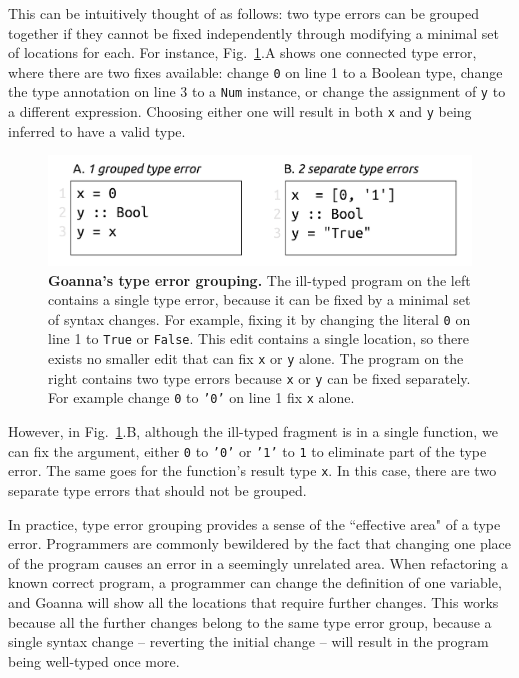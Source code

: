     This can be intuitively thought of as follows: two type errors can be grouped together if they cannot be fixed independently through modifying a minimal set of locations for each. For instance, Fig.~\ref{fig:grouping-example}.A shows one connected type error, where there are two fixes available: change \texttt{0} on line 1 to a Boolean type, change the type annotation on line 3 to a \texttt{Num} instance, or change the assignment of \texttt{y} to a different expression. Choosing either one will result in both \texttt{x} and \texttt{y} being inferred to have a valid type.
    
    

   \begin{figure}[ht!]
        \centering
        \includegraphics[width=0.8\linewidth]{images/Grouping-Example}
        \caption[Goanna's type error grouping]{\textbf{Goanna's type error grouping.} The ill-typed program on the left contains a single type error, because it can be fixed by a minimal set of syntax changes. For example, fixing it by changing the literal \texttt{0} on line 1 to \texttt{True} or \texttt{False}. This edit contains a single location, so there exists no smaller edit that can fix \texttt{x} or \texttt{y} alone. The program on the right contains two type errors because \texttt{x} or \texttt{y} can be fixed separately. For example change \texttt{0} to \texttt{'0'} on line 1 fix \texttt{x} alone. }
        \label{fig:grouping-example}
    \end{figure}



    However, in Fig.~\ref{fig:grouping-example}.B, although the ill-typed fragment is in a single function, we can fix the argument, either \texttt{0} to \texttt{'0'} or \texttt{'1'} to \texttt{1} to eliminate part of the type error. The same goes for the function's result type \texttt{x}. In this case, there are two separate type errors that should not be grouped.

	
	In practice, type error grouping provides a sense of the ``effective area" of a type error. Programmers are commonly bewildered by the fact that changing one place of the program causes an error in a seemingly unrelated area. When refactoring a known correct program, a programmer can change the definition of one variable, and Goanna will show all the locations that require further changes. This works because all the further changes belong to the same type error group, because a single syntax change -- reverting the initial change -- will result in the program being well-typed once more.
	

